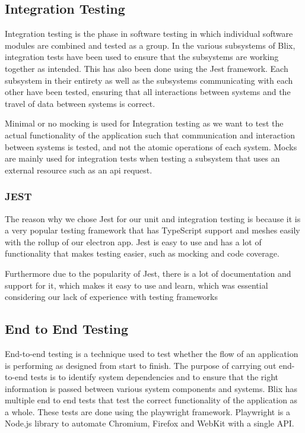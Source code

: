 \documentclass[11pt,a4paper]{article}
\begin{document}
\subsection*{Integration Testing}

Integration testing is the phase in software testing in which individual
software modules are combined and tested as a group. In the various subsystems
of Blix, integration tests have been used to ensure that the subsystems are
working together as intended. This has also been done using the Jest framework.
Each subsystem in their entirety as well as the subsystems communicating with
each other have been tested, ensuring that all interactions between systems and
the travel of data between systems is correct.

Minimal or no mocking is used for Integration testing as we want to test the
actual functionality of the application such that communication and interaction
between systems is tested, and not the atomic operations of each system. Mocks
are mainly used for integration tests when testing a subsystem that uses an
external resource such as an api request. 


\subsubsection*{JEST}

The reason why we chose Jest for our unit and integration testing is because it
is a very popular testing framework that has TypeScript support and meshes
easily with the rollup of our electron app. Jest is easy to use and has a lot of
functionality that makes testing easier, such as mocking and code coverage.

Furthermore due to the popularity of Jest, there is a lot of documentation and
support for it, which makes it easy to use and learn, which was essential
considering our lack of experience with testing frameworks

\subsection*{End to End Testing}

End-to-end testing is a technique used to test whether the flow of an
application is performing as designed from start to finish. The purpose of
carrying out end-to-end tests is to identify system dependencies and to ensure
that the right information is passed between various system components and
systems. Blix has multiple end to end tests that test the correct functionality
of the application as a whole. These tests are done using the playwright
framework. Playwright is a Node.js library to automate Chromium, Firefox and
WebKit with a single API. 
\end{document}
